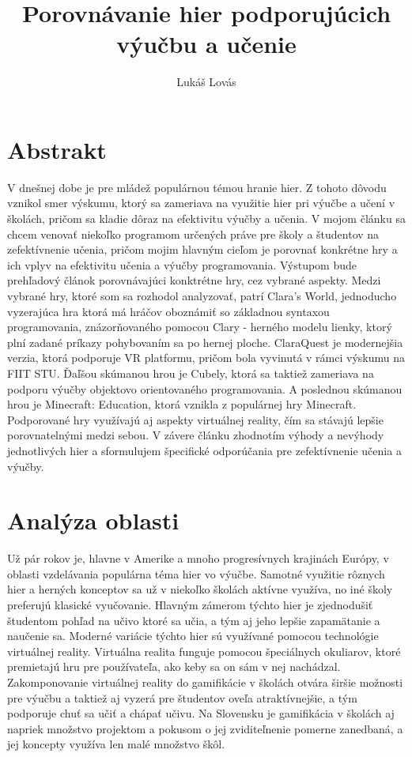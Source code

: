 \documentclass[10pt,twoside,slovak,a4paper]{article}
\title{Porovnávanie hier podporujúcich výučbu a učenie}
\author{Lukáš Lovás}
\begin{document}
\maketitle

\section{Abstrakt}
V dnešnej dobe je pre mládež populárnou témou hranie hier. Z tohoto dôvodu vznikol smer výskumu, ktorý sa zameriava na využitie hier pri výučbe a učení v školách, pričom sa kladie dôraz na efektivitu výučby a učenia. V mojom článku sa chcem venovať niekoľko programom určených práve pre školy a študentov na zefektívnenie učenia, pričom mojim hlavným cieľom je porovnať konkrétne hry a ich vplyv na efektivitu učenia a výučby programovania. Výstupom bude prehľadový článok porovnávajúci konktrétne hry, cez vybrané aspekty. Medzi vybrané hry, ktoré som sa rozhodol analyzovať, patrí Clara's World\cite{ClarasWorld}, jednoducho vyzerajúca hra ktorá má hráčov oboznámiť so základnou syntaxou programovania, znázorňovaného pomocou Clary - herného modelu lienky, ktorý plní zadané príkazy pohybovaním sa po hernej ploche. ClaraQuest\cite{ClaraQuest} je modernejšia verzia, ktorá podporuje VR platformu, pričom bola vyvinutá v rámci výskumu na FIIT STU. Ďaľšou skúmanou hrou je Cubely\cite{Cubely}, ktorá sa taktiež zameriava na podporu výučby objektovo orientovaného programovania. A poslednou skúmanou hrou je Minecraft: Education\cite{MinecraftEd}, ktorá vznikla z populárnej hry Minecraft. Podporované hry využívajú aj aspekty virtuálnej reality, čím sa stávajú lepšie porovnatelnými medzi sebou. V závere článku zhodnotím výhody a nevýhody jednotlivých hier a sformulujem špecifické odporúčania pre zefektívnenie učenia a výučby. 


\section{Analýza oblasti}
Už pár rokov je, hlavne v Amerike a mnoho progresívnych krajinách Európy, v oblasti vzdelávania populárna téma hier vo výučbe. Samotné využitie rôznych hier a herných konceptov sa už v niekoľko školách aktívne využíva, no iné školy preferujú klasické vyučovanie. Hlavným zámerom týchto hier je zjednodušiť študentom pohľad na učivo ktoré sa učia, a tým aj jeho lepšie zapamätanie a naučenie sa. Moderné variácie týchto hier sú využívané pomocou technológie virtuálnej reality. Virtuálna realita funguje pomocou špeciálnych okuliarov, ktoré premietajú hru pre používateľa, ako keby sa on sám v nej nachádzal. Zakomponovanie virtuálnej reality do gamifikácie v školách otvára širšie možnosti pre výučbu a taktiež aj vyzerá pre študentov oveľa atraktívnejšie, a tým podporuje chuť sa učiť a chápať učivu. Na Slovensku je gamifikácia v školách aj napriek množstvo projektom a pokusom o jej zviditeľnenie pomerne zanedbaná, a jej koncepty využíva len malé množstvo škôl.
\end{document}
